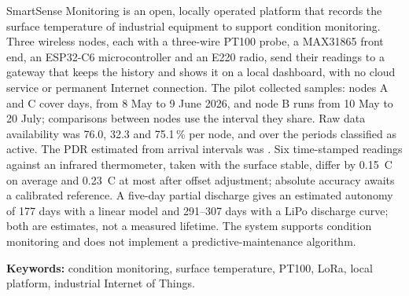 SmartSense Monitoring is an open, locally operated platform that records the surface temperature of industrial equipment to support condition monitoring. Three wireless nodes, each with a three-wire PT100 probe, a MAX31865 front end, an ESP32-C6 microcontroller and an E220 radio, send their readings to a gateway that keeps the history and shows it on a local dashboard, with no cloud service or permanent Internet connection. The pilot collected \TotalMuestras{} samples: nodes A and C cover \DuracionComunDias{} days, from 8 May to 9 June 2026, and node B runs from 10 May to 20 July; comparisons between nodes use the interval they share. Raw data availability was 76.0, 32.3 and 75.1\,\% per node, and \DisponibilidadEnlace{} over the periods classified as active. The PDR estimated from arrival intervals was \PDREstimado{}. Six time-stamped readings against an infrared thermometer, taken with the surface stable, differ by 0.15~\textdegree C on average and 0.23~\textdegree C at most after offset adjustment; absolute accuracy awaits a calibrated reference. A five-day partial discharge gives an estimated autonomy of 177 days with a linear model and 291--307 days with a LiPo discharge curve; both are estimates, not a measured lifetime. The system supports condition monitoring and does not implement a predictive-maintenance algorithm.

\noindent\textbf{Keywords:} condition monitoring, surface temperature, PT100, LoRa, local platform, industrial Internet of Things.
\clearpage
